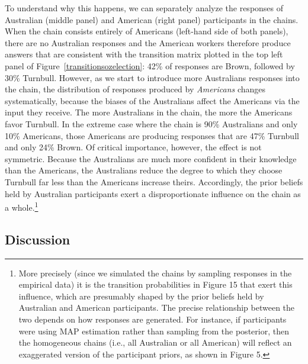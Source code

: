 \documentclass[doc]{apa6}
\begin{document}
To understand why this happens, we can separately analyze the responses of Australian (middle panel) and American (right panel) participants in the chains. When the chain consists entirely of Americans (left-hand side of both panels), there are no Australian responses and the American workers therefore produce answers that are consistent with the transition matrix plotted in the top left panel of Figure~\ref{transitionsozelection}: 42\% of responses are Brown, followed by 30\% Turnbull. However, as we start to introduce more Australians responses into the chain, the distribution of responses produced by {\it Americans} changes systematically, because the biases of the Australians affect the Americans via the input they receive. The more Australians in the chain, the more the Americans favor Turnbull. In the extreme case where the chain is 90\% Australians and only 10\% Americans, those Americans are producing responses that are 47\% Turnbull and only 24\% Brown. Of critical importance, however, the effect is not symmetric. Because the Australians are much more confident in their knowledge than the Americans, the Australians reduce the degree to which they choose Turnbull far less than the Americans increase theirs. Accordingly, the prior beliefs held by Australian participants exert a disproportionate influence on the chain as a whole.\footnote{More precisely (since we simulated the chains by sampling responses in the empirical data) it is the transition probabilities in Figure 15 that exert this influence, which are presumably shaped by the prior beliefs held by Australian and American participants. The precise relationship between the two depends on how responses are generated. For instance, if participants were using MAP estimation rather than sampling from the posterior, then the homogeneous chains (i.e., all Australian or all American) will reflect an exaggerated version of the participant priors, as shown in Figure 5.}

\subsection{Discussion}
\end{document}

